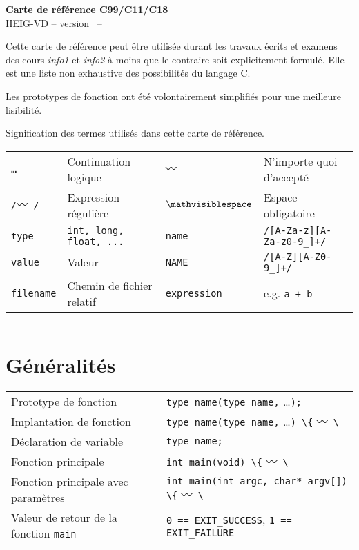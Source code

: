 \documentclass{article}
\newcommand{\etc}{\small \ldots}
\newcommand{\any}{$\hzigzag$~}
\newcommand{\spc}{$\mathvisiblespace$}
\newcommand{\cd}{\lstinline}
\begin{document}
\begin{multicols*}{3}

\begin{center}
  {\Large \bf Carte de référence C99/C11/C18} \\
  HEIG-VD -- version \revision \ -- \revisiondate \\
\end{center}

Cette carte de référence peut être utilisée durant les travaux écrits et examens
des cours \emph{info1} et \emph{info2} à moins que le contraire soit explicitement formulé.
Elle est une liste non exhaustive des possibilités du langage C.

Les prototypes de fonction ont été volontairement simplifiés pour une meilleure lisibilité.

Signification des termes utilisés dans cette carte de référence.

\begin{tabularx}{\linewidth}{
  >{\hsize=0.5\hsize}X%
  >{\hsize=1.5\hsize}X%
  >{\hsize=0.5\hsize}X%
  >{\hsize=1.5\hsize}X%
  }

  \tt \etc      & Continuation logique    & \tt \any    & N'importe quoi d'accepté \\
  \tt /\any/    & Expression régulière    & \tt \spc    & Espace obligatoire \\
  \cd{type}     & \tt int, long, float, ... & \cd{name} & \tt /[A-Za-z][A-Za-z0-9\_]+/ \\
  \cd{value}    & Valeur & \cd{NAME} & \tt /[A-Z][A-Z0-9\_]+/ \\
  \cd{filename} & Chemin de fichier relatif & \cd{expression}   & e.g. \tt a + b \\
\end{tabularx}
\hrule
\section*{Généralités}
\begin{tabularx}{\linewidth}{lX}
  Prototype de fonction               & \cd{type name(type name,} \etc \cd{);} \\
  Implantation de fonction         & \cd{type name(type name,} \etc \cd{) \{} \any \cd{\}} \\
  Déclaration de variable            & \cd{type name;} \\
  Fonction principale                & \cd{int main(void) \{} \any \cd{\}} \\
  Fonction principale avec paramètres & \cd{int main(int argc, char* argv[]) \{} \any \cd{\}} \\
  Valeur de retour de la fonction \texttt{main} & \cd{0 == EXIT_SUCCESS}, \cd{1 == EXIT_FAILURE}\\
\end{tabularx}


\end{multicols*}
\end{document}
